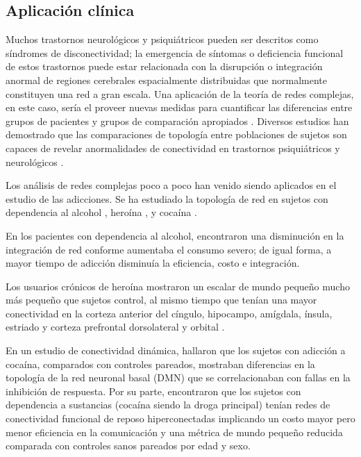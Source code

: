 \subsection{Aplicación clínica}
Muchos trastornos neurológicos y psiquiátricos pueden ser descritos como síndromes de disconectividad; la emergencia de síntomas o deficiencia funcional de estos trastornos puede estar relacionada con la disrupción o integración anormal de regiones cerebrales espacialmente distribuidas que normalmente constituyen una red a gran escala. Una aplicación de la teoría de redes complejas, en este caso, sería el proveer nuevas medidas para cuantificar las diferencias entre grupos de pacientes y grupos de comparación apropiados \parencite{Bullmore2009a}. Diversos estudios han demostrado que las comparaciones de topología entre poblaciones de sujetos son capaces de revelar anormalidades de conectividad en trastornos psiquiátricos y neurológicos \parencite{Bassett2009}. \par
Los análisis de redes complejas poco a poco han venido siendo aplicados en el estudio de las adicciones. Se ha estudiado la topología de red en sujetos con dependencia al alcohol \parencite{Sjoerds2017}, heroína \parencite{Liu2009}, y cocaína \parencite{Zhang2018, Wang2015a}. \par
En los pacientes con dependencia al alcohol, \textcite{Sjoerds2017} encontraron una disminución en la integración de red conforme aumentaba el consumo severo; de igual forma, a mayor tiempo de adicción disminuía la eficiencia, costo e integración.\par
Los usuarios crónicos de heroína mostraron un escalar de mundo pequeño mucho más pequeño que sujetos control, al mismo tiempo que tenían una mayor conectividad en la corteza anterior del cíngulo, hipocampo, amígdala, ínsula, estriado y corteza prefrontal dorsolateral y orbital \parencite{Liu2009}. \par
En un estudio de conectividad dinámica, \textcite{Zhang2018} hallaron que los sujetos con adicción a cocaína, comparados con controles pareados, mostraban diferencias en la topología de la red neuronal basal (DMN) que se correlacionaban con fallas en la inhibición de respuesta.
Por su parte, \textcite{Wang2015a} encontraron que los sujetos con dependencia a sustancias (cocaína siendo la droga principal) tenían redes de conectividad funcional de reposo hiperconectadas \textemdash{}implicando un costo mayor\textemdash{} pero menor eficiencia en la comunicación y una métrica de mundo pequeño reducida comparada con controles sanos pareados por edad y sexo.

